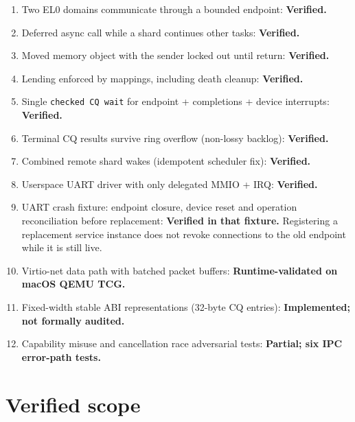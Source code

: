 \begin{enumerate}
    \item Two EL0 domains communicate through a bounded endpoint: \textbf{Verified.}
    \item Deferred async call while a shard continues other tasks: \textbf{Verified.}
    \item Moved memory object with the sender locked out until return:
        \textbf{Verified.}
    \item Lending enforced by mappings, including death cleanup: \textbf{Verified.}
    \item Single \texttt{checked CQ wait} for endpoint + completions + device interrupts: \textbf{Verified.}
    \item Terminal CQ results survive ring overflow (non-lossy backlog): \textbf{Verified.}
    \item Combined remote shard wakes (idempotent scheduler fix): \textbf{Verified.}
    \item Userspace UART driver with only delegated MMIO + IRQ: \textbf{Verified.}
    \item UART crash fixture: endpoint closure, device reset and operation
        reconciliation before replacement: \textbf{Verified in that fixture.}
        Registering a replacement service instance does not revoke connections
        to the old endpoint while it is still live.
    \item Virtio-net data path with batched packet buffers: \textbf{Runtime-validated on macOS QEMU TCG.}
    \item Fixed-width stable ABI representations (32-byte CQ entries): \textbf{Implemented; not formally audited.}
    \item Capability misuse and cancellation race adversarial tests: \textbf{Partial; six IPC error-path tests.}
\end{enumerate}

\section{Verified scope}

